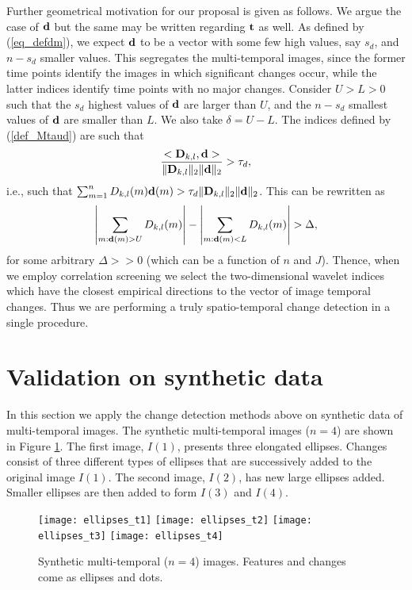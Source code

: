 \documentclass[journal]{IEEEtran}
\newcommand{\vD}{{\textbf D}}
\newcommand{\vd}{{\textbf d}}
\newcommand{\vt}{{\textbf t}}
\begin{document}
Further geometrical motivation for our proposal is given as follows.  We argue the case of $\vd$ but the same may be written regarding $\vt$ as well. As defined by (\ref{eq_defdm}), we expect $\vd$ to be a vector with some few high values, say $s_d$, and $n-s_d$ smaller values. This segregates the multi-temporal images, since the former time points identify the images in which significant changes occur, while the latter indices identify time points with no major changes. Consider $U>L>0$ such that the $s_d$ highest values of $\vd$ are larger than $U$, and the $n-s_d$ smallest values of $\vd$ are smaller than $L$. We also take $\delta=U-L$. The indices defined by  (\ref{def_Mtaud}) are such that   
\[
\frac{<\vD_{k,l},\vd>}{\|\vD_{k,l}\|_2\|\vd\|_2}>\tau_d,
\]
i.e., such that  $\sum_{m=1}^nD_{k,l}(m)\vd(m)>\tau_d\|\vD_{k,l}\|_2\|\vd\|_2$. This can be rewritten as
\[
\left|\sum_{m:\vd(m)>U} D_{k,l}(m)\right|-\left|\sum_{m:\vd(m)<L} D_{k,l}(m)\right|>\Delta,
\]
for some arbitrary $\Delta>>0$ (which can be a function of $n$ and $J$). Thence, when we employ correlation screening we select the two-dimensional wavelet indices which have the closest empirical directions to the vector of image temporal changes. Thus we are performing a truly spatio-temporal change detection in a single procedure.




\section{Validation on synthetic data}\label{section_validation}

In this section we apply the change detection methods above on synthetic data of multi-temporal images. 
The synthetic multi-temporal images ($n=4$) are shown in Figure \ref{F:EllipsoidChanges}. The first image, $I(1)$, presents three elongated ellipses. Changes consist of three different types of ellipses that are successively added to the original image $I(1)$. The second image, $I(2)$, has new large ellipses added. Smaller ellipses are then added to form $I(3)$ and $I(4)$. 

\begin{figure}[htb!]
\centering
\texttt{[image: ellipses\_t1]}
\texttt{[image: ellipses\_t2]}
\texttt{[image: ellipses\_t3]}
\texttt{[image: ellipses\_t4]}
\caption{Synthetic multi-temporal ($n=4$) images. Features and changes come as ellipses and dots.}
\label{F:EllipsoidChanges}
\end{figure}
\end{document}
